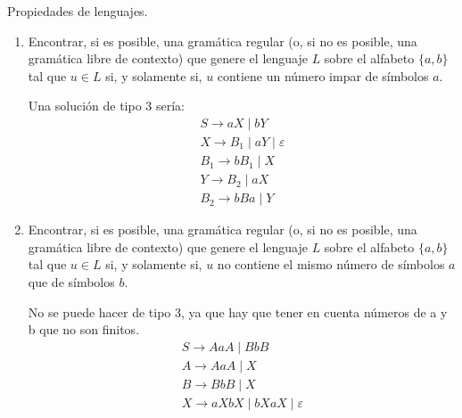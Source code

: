 \documentclass[12pt]{book} %
\begin{document}
\begin{ejercicio}
Propiedades de lenguajes.

\begin{enumerate}[label=\alph*)]
    \item Encontrar, si es posible, una gramática regular (o, si no es posible, una gramática libre de contexto) que genere el lenguaje $L$ sobre el alfabeto $\{a, b\}$ tal que $u \in L$ si, y solamente si, $u$ contiene un número impar de símbolos $a$.

    \begin{solucion}[a)]
    Una solución de tipo 3 sería:
    \begin{align*}
        S \rightarrow aX \mid bY \\
        X \rightarrow B_1 \mid aY \mid \varepsilon \\
        B_1 \rightarrow bB_1 \mid X \\
        Y \rightarrow B_2 \mid aX \\
        B_2 \rightarrow bBa \mid Y 
    \end{align*}
    \end{solucion}

    \item Encontrar, si es posible, una gramática regular (o, si no es posible, una gramática libre de contexto) que genere el lenguaje $L$ sobre el alfabeto $\{a, b\}$ tal que $u \in L$ si, y solamente si, $u$ no contiene el mismo número de símbolos $a$ que de símbolos $b$.

    \begin{solucion}[b)]
    No se puede hacer de tipo 3, ya que hay que tener en cuenta números de a y b que no son finitos.
    \begin{align*}
        S \rightarrow AaA \mid BbB \\
        A \rightarrow AaA \mid X \\
        B \rightarrow BbB \mid X \\
        X \rightarrow aXbX \mid bXaX \mid \varepsilon 
    \end{align*}
    \end{solucion}


\end{enumerate}

\end{ejercicio}
\end{document}
